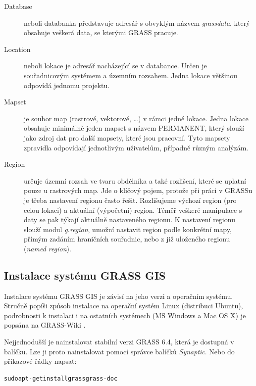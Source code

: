 \documentclass[a4paper,12pt,draft]{article}
\begin{document}
\begin{description}
\item[Database] neboli databanka představuje adresář s obvyklým názvem \emph{grassdata}, který obsahuje veškerá data, se kterými GRASS pracuje.
\item [Location] neboli lokace je adresář nacházející se v databance. Určen je souřadnicovým systémem a územním rozsahem. Jedna lokace většinou odpovídá jednomu projektu.
\item [Mapset] je soubor map (rastrové, vektorové, \ldots) v rámci jedné lokace. Jedna lokace obsahuje minimálně jeden mapset s názvem PERMANENT, který  slouží jako zdroj dat pro další mapsety, které jsou pracovní. Tyto mapsety zpravidla odpovídají jednotlivým uživatelům, případně různým analýzám.
\item [Region] určuje územní rozsah ve tvaru obdélníka a také rozlišení, které se uplatní pouze u rastrových map. Jde o klíčový pojem, protože při práci v GRASSu je třeba nastavení regionu často řešit.  Rozlišujeme výchozí region (pro celou lokaci) a aktuální (výpočetní) region. Téměř veškeré manipulace s daty se pak týkají aktuálně nastaveného regionu. K nastavení regionu slouží modul \emph{g.region}, umožní nastavit region podle konkrétní mapy, přímým zadáním hraničních souřadnic, nebo z již uloženého regionu (\emph{named region}). 
 \end{description}

\subsection{Instalace systému GRASS GIS}
Instalace systému GRASS GIS je závisí na jeho verzi a operačním systému. Stručně popíši způsob instalace na operační systém Linux (distribuci Ubuntu), podrobnosti k instalaci i na ostatních systémech (MS Windows a Mac OS X) je popsána na GRASS-Wiki \cite{instalace}.

Nejjednodušší je nainstalovat stabilní verzi GRASS 6.4, která je dostupná v balíčku. Lze ji proto nainstalovat pomocí správce balíčků \emph{Synaptic}. Nebo do příkazové řádky napsat:
\begin{alltt}
{\footnotesize sudo apt-get install grass grass-doc}
\end{alltt}
\end{document}
